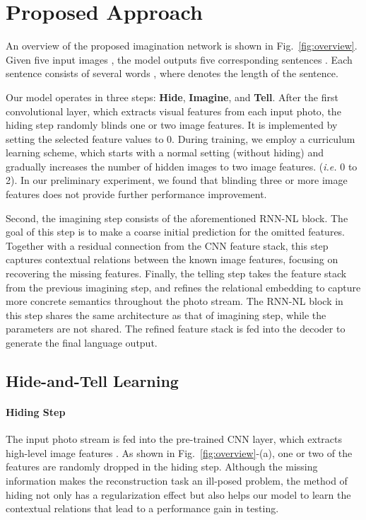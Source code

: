 \documentclass[letterpaper]{article} \usepackage{aaai20}  \usepackage{times}  \usepackage{helvet} \usepackage{courier}  \usepackage[hyphens]{url}  \usepackage{graphicx} \urlstyle{rm} \def\UrlFont{\rm}  \usepackage{graphicx}  \frenchspacing  \setlength{\pdfpagewidth}{8.5in}  \setlength{\pdfpageheight}{11in}
\newcommand{\figref}[1]{Fig.~\ref{#1}}
\newcommand{\ie}{{\it i.e. }}
\begin{document}
\section{Proposed Approach}
An overview of the proposed imagination network is shown in \figref{fig:overview}. 
Given five input images \textit{}, the model outputs five corresponding sentences \textit{}.
Each sentence consists of several words \textit{}, where  denotes the length of the sentence.

Our model operates in three steps: \textbf{Hide}, \textbf{Imagine}, and \textbf{Tell}. 
After the first convolutional layer, which extracts visual features from each input photo, the hiding step randomly blinds one or two image features. It is implemented by setting the selected feature values to 0. During training, we employ a curriculum learning scheme, which starts with a normal setting (without hiding) and gradually increases the number of hidden images to two image features. (\ie 0 to 2). In our preliminary experiment, we found that blinding three or more image features does not provide further performance improvement.

Second, the imagining step consists of the aforementioned RNN-NL block. The goal of this step is to make a coarse initial prediction for the omitted features. Together with a residual connection from the CNN feature stack, this step captures contextual relations between the known image features, focusing on recovering the missing features. Finally, the telling step takes the feature stack from the previous imagining step, and refines the relational embedding to capture more concrete semantics throughout the photo stream. The RNN-NL block in this step shares the same architecture as that of imagining step, while the parameters are not shared. The refined feature stack is fed into the decoder to generate the final language output.




\subsection{Hide-and-Tell Learning}
\paragraph{Hiding Step}
\quad

\noindent
The input photo stream \textit{} is fed into the pre-trained CNN layer, which extracts high-level image features \textit{}. As shown in \figref{fig:overview}-(a), one or two of the features  are randomly dropped in the hiding step. Although the missing information makes the reconstruction task an ill-posed problem, the method of hiding not only has a regularization effect but also helps our model to learn the contextual relations that lead to a performance gain in testing.
\end{document}
